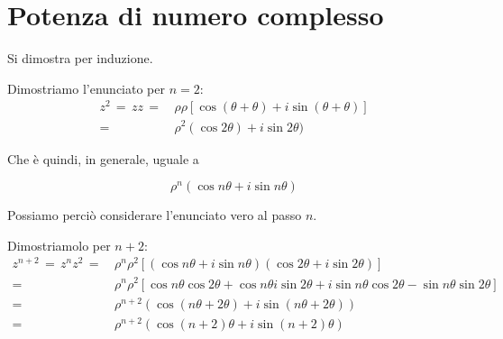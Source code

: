 \documentclass[../../dimostrazioni]{subfiles}
\begin{document}
        \section*{Potenza di numero complesso}

            Si dimostra per induzione.
            
            \medskip

            Dimostriamo l'enunciato per \(n = 2\):
            \begin{align*}
                z^2 \, = \, zz \, =& \, \rho\rho [\cos(\theta + \theta) + i\sin(\theta+\theta)] \\
                                  =& \, \rho^2(\cos2\theta)+ i\sin2\theta)
            \end{align*}

            Che è quindi, in generale, uguale a

            \[\rho^n (\cos n\theta +i\sin n\theta)\]

            Possiamo perciò considerare l'enunciato vero al passo \(n\).

            \medskip

            Dimostriamolo per \(n + 2\):
            \begin{align*}
                z^{n+2} \, = \, z^n z^2 \, =& \, \rho^n \rho^2 [(\cos n\theta + i\sin n\theta)(\cos 2\theta + i\sin 2\theta)] \\
                                           =& \, \rho^n \rho^2 [\cos n\theta\cos2\theta + \cos n\theta i\sin2\theta + i\sin n\theta \cos2\theta - \sin n\theta \sin2\theta] \\
                                           =& \, \rho^{n+2} (\cos(n\theta + 2\theta) + i\sin(n\theta + 2\theta)) \\
                                           =& \, \rho^{n+2} (\cos(n+2)\theta + i\sin(n+2)\theta)
            \end{align*}
            
\end{document}
